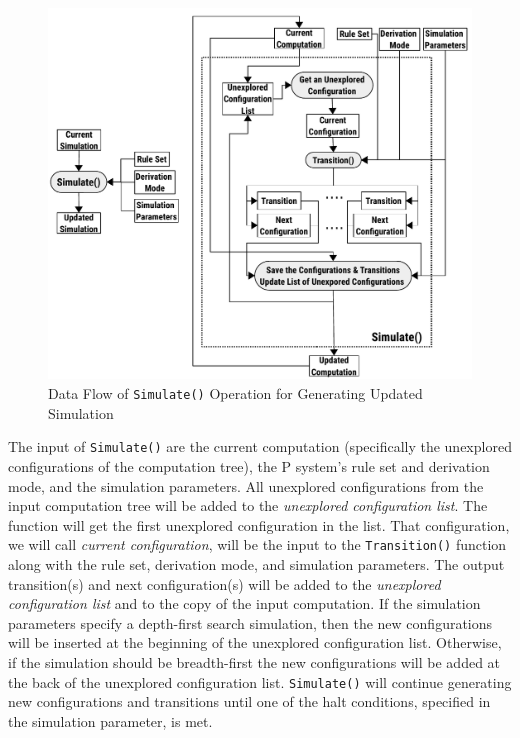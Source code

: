 \documentclass{article}
\begin{document}
\begin{figure}[H]
\begin{center}
\includegraphics[scale=0.95]{figures/zzz-data-flow-2.pdf}
\caption{Data Flow of \texttt{Simulate()} Operation for Generating Updated Simulation}
\label{fig:data-flow-2}
\end{center}
\end{figure}

The input of \texttt{Simulate()} are the current computation (specifically the unexplored 
configurations of the computation tree), the P system's rule set and derivation mode, and the 
simulation parameters. All unexplored configurations from the input computation tree will be 
added to the \textit{unexplored configuration list}. The function will get the first unexplored
configuration in the list. That configuration, we will call \textit{current configuration}, will
be the input to the \texttt{Transition()} function along with the rule set, derivation mode, and
simulation parameters. The output transition(s) and next configuration(s) will be added to the
\textit{unexplored configuration list} and to the copy of the input computation. If the simulation
parameters specify a depth-first search simulation, then the new configurations will be inserted at
the beginning of the unexplored configuration list. Otherwise, if the simulation should be 
breadth-first the new configurations will be added at the back of the unexplored configuration list.
\texttt{Simulate()} will continue generating new configurations and transitions until one of the 
halt conditions, specified in the simulation parameter, is met.
\end{document}
